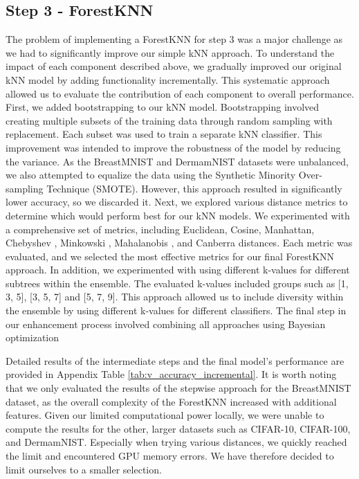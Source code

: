 \documentclass[a4paper]{article}
\begin{document}
\subsection{Step 3 - ForestKNN}
The problem of implementing a ForestKNN for step 3 was a major challenge as we had to significantly improve our simple kNN approach. To understand the impact of each component described above, we gradually improved our original kNN model by adding functionality incrementally. This systematic approach allowed us to evaluate the contribution of each component to overall performance.
First, we added bootstrapping to our kNN model. Bootstrapping involved creating multiple subsets of the training data through random sampling with replacement. Each subset was used to train a separate kNN classifier. This improvement was intended to improve the robustness of the model by reducing the variance.
As the BreastMNIST and DermamNIST datasets were unbalanced, we also attempted to equalize the data using the Synthetic Minority Over-sampling Technique (SMOTE). However, this approach resulted in significantly lower accuracy, so we discarded it. 
Next, we explored various distance metrics to determine which would perform best for our kNN models. We experimented with a comprehensive set of metrics, including Euclidean, Cosine, Manhattan, Chebyshev \citep{chebyshev1867}, Minkowski \citep{minkowski1896}, Mahalanobis \citep{mahalanobis1936}, and Canberra \citep{lance1967} distances. Each metric was evaluated, and we selected the most effective metrics for our final ForestKNN approach.
In addition, we experimented with using different k-values for different subtrees within the ensemble. The evaluated k-values included groups such as [1, 3, 5], [3, 5, 7] and [5, 7, 9]. This approach allowed us to include diversity within the ensemble by using different k-values for different classifiers.
The final step in our enhancement process involved combining all approaches using Bayesian optimization

Detailed results of the intermediate steps and the final model's performance are provided in Appendix Table \ref{tab:v_accuracy_incremental}. It is worth noting that we only evaluated the results of the stepwise approach for the BreastMNIST dataset, as the overall complexity of the ForestKNN increased with additional features. Given our limited computational power locally, we were unable to compute the results for the other, larger datasets such as CIFAR-10, CIFAR-100, and DermamNIST. Especially when trying various distances, we quickly reached the limit and encountered GPU memory errors. We have therefore decided to limit ourselves to a smaller selection.
\end{document}
